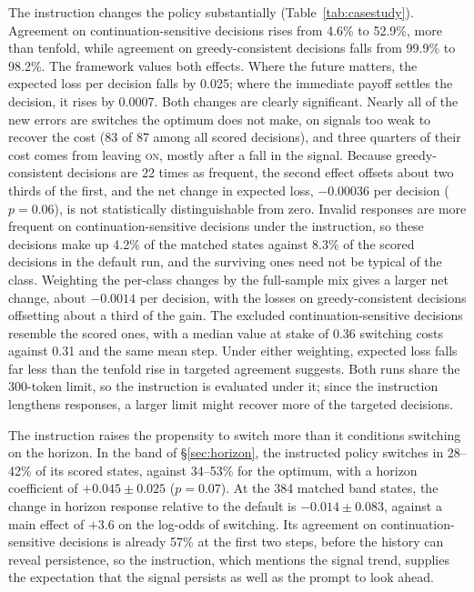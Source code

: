 \documentclass[10pt,a4paper,twocolumn]{article}
\newcommand{\ON}{\textsc{on}}
\begin{document}
The instruction changes the policy substantially (Table~\ref{tab:casestudy}). Agreement on continuation-sensitive decisions rises from 4.6\% to 52.9\%, more than tenfold, while agreement on greedy-consistent decisions falls from 99.9\% to 98.2\%. The framework values both effects. Where the future matters, the expected loss per decision falls by 0.025; where the immediate payoff settles the decision, it rises by 0.0007. Both changes are clearly significant. Nearly all of the new errors are switches the optimum does not make, on signals too weak to recover the cost (83 of 87 among all scored decisions), and three quarters of their cost comes from leaving \ON{}, mostly after a fall in the signal. Because greedy-consistent decisions are 22 times as frequent, the second effect offsets about two thirds of the first, and the net change in expected loss, $-0.00036$ per decision ($p{=}0.06$), is not statistically distinguishable from zero. Invalid responses are more frequent on continuation-sensitive decisions under the instruction, so these decisions make up 4.2\% of the matched states against 8.3\% of the scored decisions in the default run, and the surviving ones need not be typical of the class. Weighting the per-class changes by the full-sample mix gives a larger net change, about $-0.0014$ per decision, with the losses on greedy-consistent decisions offsetting about a third of the gain. The excluded continuation-sensitive decisions resemble the scored ones, with a median value at stake of 0.36 switching costs against 0.31 and the same mean step. Under either weighting, expected loss falls far less than the tenfold rise in targeted agreement suggests. Both runs share the 300-token limit, so the instruction is evaluated under it; since the instruction lengthens responses, a larger limit might recover more of the targeted decisions.

The instruction raises the propensity to switch more than it conditions switching on the horizon. In the band of \S\ref{sec:horizon}, the instructed policy switches in 28--42\% of its scored states, against 34--53\% for the optimum, with a horizon coefficient of $+0.045\pm0.025$ ($p{=}0.07$). At the 384 matched band states, the change in horizon response relative to the default is $-0.014\pm0.083$, against a main effect of $+3.6$ on the log-odds of switching. Its agreement on continuation-sensitive decisions is already 57\% at the first two steps, before the history can reveal persistence, so the instruction, which mentions the signal trend, supplies the expectation that the signal persists as well as the prompt to look ahead.
\end{document}
